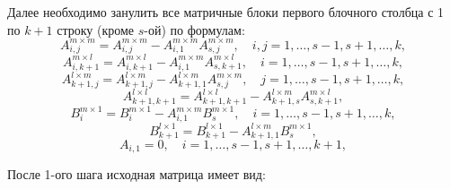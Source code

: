 \documentclass[a4paper,12pt]{article}
\begin{document}
Далее необходимо занулить все матричные блоки первого блочного столбца с 1 по $k+1$ строку (кроме $s$-ой) по формулам:
$$
    A^{m \times m}_{i,j} = A^{m \times m}_{i,j} - A^{m \times m}_{i,1}A^{m \times m}_{s,j}, \quad i,j=1,\dots,s-1,s+1,\dots,k,
$$
$$
    A^{m \times l}_{i, k+1} = A^{m \times l}_{i, k+1} - A^{m \times m}_{i, 1}A^{m \times l}_{s, k+1}, \quad i=1,\dots,s-1,s+1,\dots,k,
$$
$$
    A^{l \times m}_{k+1, j} = A^{l \times m}_{k+1, j} - A^{l \times m}_{k+1, 1}A^{m \times m}_{s, j}, \quad j=1,\dots,s-1,s+1,\dots,k,
$$
$$
    A^{l \times l}_{k+1, k+1} = A^{l \times l}_{k+1, k+1} - A^{l \times m}_{k+1, s}A^{m \times l}_{s, k+1},
$$
$$
    B^{m \times 1}_i = B^{m \times 1}_i - A^{m \times m}_{i,1}B^{m \times 1}_s, \quad i=1,\dots,s-1,s+1,\dots,k,
$$
$$
    B^{l \times 1}_{k+1} = B^{l \times 1}_{k+1} - A^{l \times m}_{k+1, 1}B^{m \times 1}_s,
$$
$$
  A_{i,1}=0, \quad i=1,\dots,s-1,s+1,\dots,k+1,  
$$

После 1-ого шага исходная матрица имеет вид:
\end{document}
